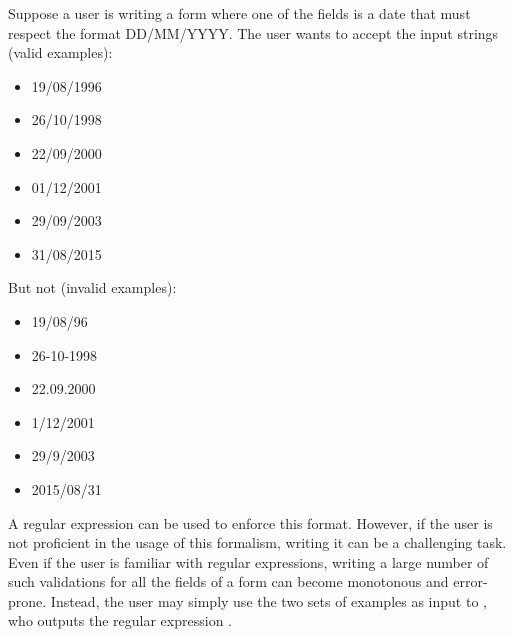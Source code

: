 \medskip\noindent
Suppose a user is writing a form where one of the fields is a date that must respect the format DD/MM/YYYY.
The user wants to accept the input strings (valid examples):
\begin{multicols}{3}
    \begin{itemize}[label={}]
    \item 19/08/1996
    \item 26/10/1998
    \item 22/09/2000
    \item 01/12/2001
    \item 29/09/2003
    \item 31/08/2015
    \end{itemize}
\end{multicols}
\noindent
But not (invalid examples):
\begin{multicols}{3}
\begin{itemize}[label={}]
\item 19/08/96
\item 26-10-1998
\item 22.09.2000
\item 1/12/2001
\item 29/9/2003
\item 2015/08/31
\end{itemize}
\end{multicols}
\noindent
A regular expression can be used to enforce this format. However, if the user is not proficient in the usage of this formalism, writing it can be a challenging task. Even if the user is familiar with regular expressions, writing a large number of such validations for all the fields of a form can become monotonous and error-prone.
Instead, the user may simply use the two sets of examples as input to \Forest{}, who outputs the regular expression .

